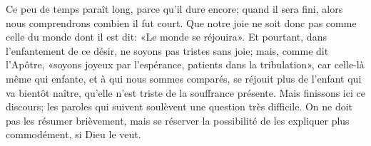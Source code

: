 Ce peu de temps paraît long, parce qu’il dure encore;
	quand il sera fini, alors nous comprendrons combien il fut court.
Que notre joie ne soit donc pas comme celle du monde dont il est dit:
	«Le monde se réjouira».
Et pourtant, dans l’enfantement de ce désir,
	ne soyons pas tristes sans joie;
	mais, comme dit l’Apôtre, «soyons joyeux par l’espérance,
	patients dans la tribulation»,
	car celle-là même qui enfante, et à qui nous sommes comparés,
	se réjouit plus de l’enfant qui va bientôt naître,
	qu’elle n’est triste de la souffrance présente.
Mais finissons ici ce discours;
	les paroles qui suivent soulèvent une question très difficile.
On ne doit pas les résumer brièvement,
	mais se réserver la possibilité de les expliquer plus commodément,
		si Dieu le veut.
